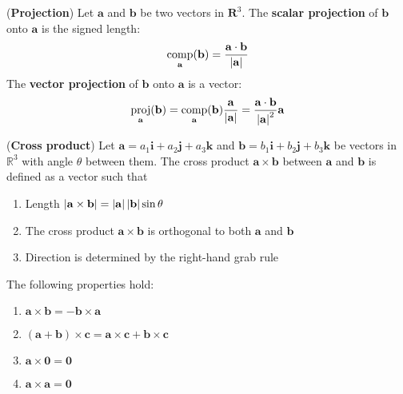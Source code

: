\documentclass{huhtakm-template-book}
\DeclareMathOperator{\proj}{proj}
\DeclareMathOperator{\comp}{comp}
\begin{document}
\newpage
\begin{defn}(\textbf{Projection})
    Let $\mathbf{a}$ and $\mathbf{b}$ be two vectors in $\mathbf{R}^{3}$. The \textbf{scalar projection} of $\mathbf{b}$ onto $\mathbf{a}$ is the signed length:
    \begin{equation*}
        \comp_{\mathbf{a}}(\mathbf{b})=\frac{\mathbf{a}\cdot\mathbf{b}}{\abs{\mathbf{a}}}
    \end{equation*}
    The \textbf{vector projection} of $\mathbf{b}$ onto $\mathbf{a}$ is a vector:
    \begin{equation*}
        \proj_{\mathbf{a}}(\mathbf{b})=\comp_{\mathbf{a}}(\mathbf{b})\frac{\mathbf{a}}{\abs{\mathbf{a}}}=\frac{\mathbf{a}\cdot\mathbf{b}}{\abs{\mathbf{a}}^{2}}\mathbf{a}
    \end{equation*}
\end{defn}
\begin{defn}(\textbf{Cross product})
    Let $\mathbf{a}=a_{1}\mathbf{i}+a_{2}\mathbf{j}+a_{3}\mathbf{k}$ and $\mathbf{b}=b_{1}\mathbf{i}+b_{2}\mathbf{j}+b_{3}\mathbf{k}$ be vectors in $\mathbb{R}^{3}$ with angle $\theta$ between them. The cross product $\mathbf{a}\times\mathbf{b}$ between $\mathbf{a}$ and $\mathbf{b}$ is defined as a vector such that
    \begin{enumerate}
        \item Length $\left|{\mathbf{a}\times\mathbf{b}}\right|=\left|{\mathbf{a}}\right|\left|{\mathbf{b}}\right|\sin\theta$
        \item The cross product $\mathbf{a}\times\mathbf{b}$ is orthogonal to both $\mathbf{a}$ and $\mathbf{b}$
        \item Direction is determined by the right-hand grab rule
    \end{enumerate}
\end{defn}
\begin{lem}
    The following properties hold:
    \begin{enumerate}
        \item $\mathbf{a}\times\mathbf{b}=-\mathbf{b}\times\mathbf{a}$
        \item $(\mathbf{a}+\mathbf{b})\times\mathbf{c}=\mathbf{a}\times\mathbf{c}+\mathbf{b}\times\mathbf{c}$
        \item $\mathbf{a}\times\mathbf{0}=\mathbf{0}$
        \item $\mathbf{a}\times\mathbf{a}=\mathbf{0}$
    \end{enumerate}
\end{lem}
\end{document}
